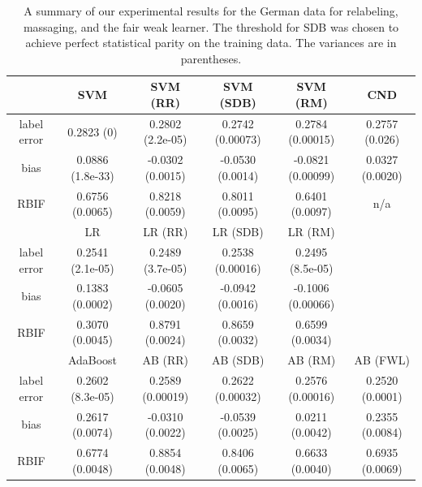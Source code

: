 \documentclass[conference]{IEEEtran}
\begin{document}
\begin{table}
\centering
\begin{tabular}{| c | ccccc |}
\hline
               & SVM & SVM (RR) & SVM (SDB) & SVM (RM) & CND \cite{KamiranC09} \\
\hline 
label error    & 0.2823 (0)      & 0.2802 (2.2e-05)   & 0.2742 (0.00073) & 0.2784 (0.00015) & 0.2757 (0.026) \\ 
bias           & 0.0886 (1.8e-33)& -0.0302 (0.0015)   & -0.0530 (0.0014)  & -0.0821 (0.00099) & 0.0327 (0.0020)  \\ 
RBIF           & 0.6756 (0.0065) & 0.8218 (0.0059)   & 0.8011 (0.0095)  & 0.6401 (0.0097) & n/a  \\ 
\hline
               & LR & LR (RR) & LR (SDB) & LR (RM) &  \\
\hline 
label error    & 0.2541 (2.1e-05)  & 0.2489 (3.7e-05)  & 0.2538 (0.00016) & 0.2495 (8.5e-05) &\\ 
bias           & 0.1383 (0.0002)  & -0.0605 (0.0020)  & -0.0942 (0.0016) & -0.1006 (0.00066) &\\ 
RBIF           & 0.3070 (0.0045)  & 0.8791 (0.0024)  & 0.8659 (0.0032) & 0.6599 (0.0034) & \\ 
\hline
               & AdaBoost & AB (RR)  & AB (SDB)  & AB (RM)   & AB (FWL)  \\
\hline 
label error    & 0.2602 (8.3e-05)  & 0.2589 (0.00019)  & 0.2622 (0.00032) & 0.2576 (0.00016) & 0.2520 (0.0001)\\ 
bias           & 0.2617 (0.0074)  & -0.0310 (0.0022)  & -0.0539 (0.0025) & 0.0211 (0.0042) & 0.2355 (0.0084)  \\ 
RBIF           & 0.6774 (0.0048)   & 0.8854 (0.0048)  & 0.8406 (0.0065) & 0.6633 (0.0040) & 0.6935 (0.0069) \\ 
\hline
\hline 
\end{tabular}
\caption{A summary of our experimental results for the German data for relabeling, massaging, and
the fair weak learner. The threshold for SDB was chosen to achieve perfect
statistical parity on the training data.  The variances are in parentheses.}
\label{table:german_results}
\end{table}
\end{document}
